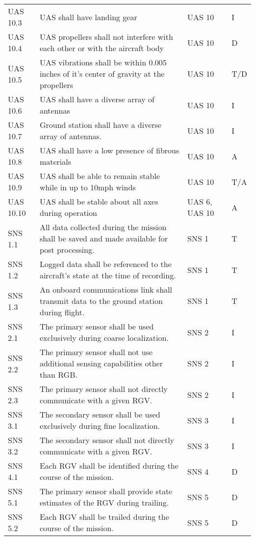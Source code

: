 \begin{tabular}{lllll}
UAS 10.3 & UAS shall have landing gear & UAS 10 &  & I \\ 
UAS 10.4 & UAS propellers shall not interfere with each other or with the aircraft body & UAS 10 &  & D \\ 
UAS 10.5 & UAS vibrations shall be within 0.005 inches of it's center of gravity at the propellers & UAS 10 &  & T/D \\ 
UAS 10.6 & UAS shall have a diverse array of antennas & UAS 10 &  & I \\ 
UAS 10.7 & Ground station shall have a diverse array of antennas. & UAS 10 &  & I \\ 
UAS 10.8 & UAS shall have a low presence of fibrous materials & UAS 10 &  & A \\ 
UAS 10.9 & UAS shall be able to remain stable while in up to 10mph winds & UAS 10 &  & T/A \\ 
UAS 10.10 & UAS shall be stable about all axes during operation & UAS 6, UAS 10 &  & A \\ 
SNS 1.1 & All data collected during the mission shall be saved and made available for post processing. & SNS 1 &  & T \\ 
SNS 1.2 & Logged data shall be referenced to the aircraft’s state at the time of recording. & SNS 1 &  & T \\ 
SNS 1.3 & An onboard communications link shall transmit data to the ground station during flight. & SNS 1 &  & T \\ 
SNS 2.1 & The primary sensor shall be used exclusively during coarse localization. & SNS 2 &  & I \\ 
SNS 2.2 & The primary sensor shall not use additional sensing capabilities other than RGB. & SNS 2 &  & I \\ 
SNS 2.3 & The primary sensor shall not directly communicate with a given RGV. & SNS 2 &  & I \\ 
SNS 3.1 & The secondary sensor shall be used exclusively during fine localization. & SNS 3 &  & I \\ 
SNS 3.2 & The secondary sensor shall not directly communicate with a given RGV. & SNS 3 &  & I \\ 
SNS 4.1 & Each RGV shall be identified during the course of the mission. & SNS 4 &  & D \\ 
SNS 5.1 & The primary sensor shall provide state estimates of the RGV during trailing. & SNS 5 &  & D \\ 
SNS 5.2 & Each RGV shall be trailed during the course of the mission. & SNS 5 &  & D \\ 

\end{tabular}
